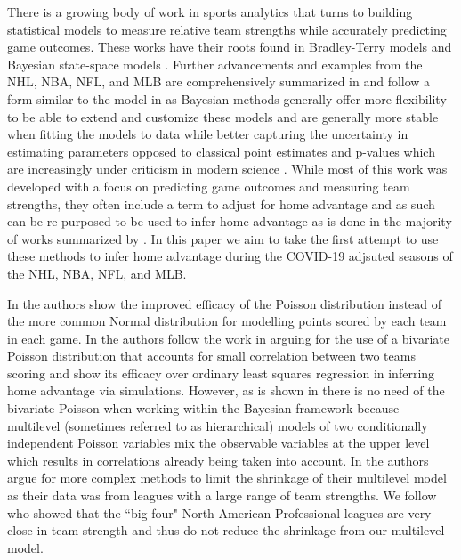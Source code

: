 There is a growing body of work in sports analytics that turns to building statistical models to measure relative team strengths while accurately predicting game outcomes. These works have their roots found in Bradley-Terry models \cite{Bradley1952} and Bayesian state-space models \cite{Glickman1998}. Further advancements and examples from the NHL, NBA, NFL, and MLB are comprehensively summarized in \cite{Lopez2018} and follow a form similar to the model in \cite{Baio2010} as Bayesian methods generally offer more flexibility to be able to extend and customize these models and are generally more stable when fitting the models to data \cite{GlickmanText2017} while better capturing the uncertainty in estimating parameters opposed to classical point estimates and p-values which are increasingly under criticism in modern science \cite{Ioannidis2005} \cite{Begley2015}. While most of this work was developed with a focus on predicting game outcomes and measuring team strengths, they often include a term to adjust for home advantage and as such can be re-purposed to be used to infer home advantage as is done in the majority of works summarized by \cite{Benz2020}. In this paper we aim to take the first attempt to use these methods to infer home advantage during the COVID-19 adjsuted seasons of the NHL, NBA, NFL, and MLB.

In \cite{Lopez2018} the authors show the improved efficacy of the Poisson distribution instead of the more common Normal distribution \cite{GlickmanText2017} for modelling points scored by each team in each game. In \cite{Benz2020} the authors follow the work in \cite{Karlis2003} arguing for the use of a bivariate Poisson distribution that accounts for small correlation between two teams scoring and show its efficacy over ordinary least squares regression in inferring home advantage via simulations. However, as is shown in \cite{Baio2010} there is no need of the bivariate Poisson when working within the Bayesian framework because multilevel (sometimes referred to as hierarchical) models of two conditionally independent Poisson variables mix the observable variables at the upper level which results in correlations already being taken into account. In \cite{Baio2010} the authors argue for more complex methods to limit the shrinkage of their multilevel model as their data was from leagues with a large range of team strengths. We follow \cite{Lopez2018} who showed that the ``big four" North American Professional leagues are very close in team strength and thus do not reduce the shrinkage from our multilevel model.

